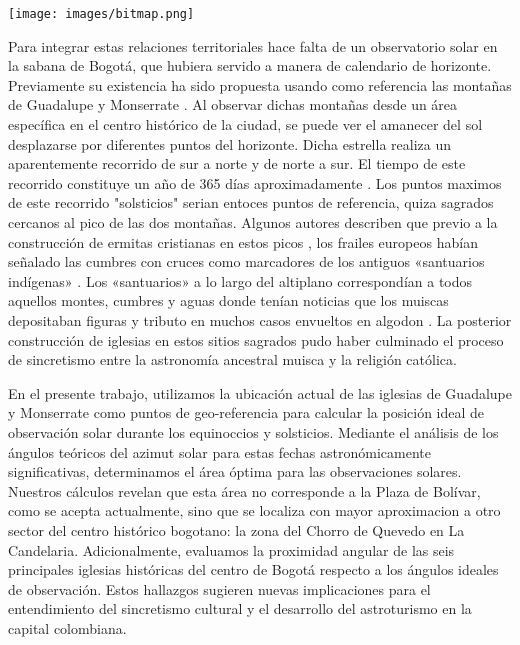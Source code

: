 \documentclass[a4paper,alpha-refs]{eSpectra}
\begin{document}
\smallskip
\centering
   \texttt{[image: images/bitmap.png]}
\justifying

\smallskip

Para integrar estas relaciones territoriales hace falta de un observatorio solar en la sabana de Bogotá, que hubiera servido a manera de calendario de horizonte. Previamente su existencia ha sido propuesta usando como referencia las montañas de Guadalupe y Monserrate \cite{bonilla_observatorio_2011}. Al observar dichas montañas desde un área específica en el centro histórico de la ciudad, se puede ver el amanecer del sol desplazarse por diferentes puntos del horizonte. Dicha estrella realiza un aparentemente recorrido de sur a norte y de norte a sur. El tiempo de este recorrido constituye un año de 365 días aproximadamente \cite{quijano_astronomia_2021}. Los puntos maximos de este recorrido "solsticios" serian entoces puntos de referencia,  quiza sagrados cercanos al pico de las dos montañas.  Algunos autores describen que previo a la construcción de ermitas cristianas en estos picos , los frailes europeos habían señalado las cumbres con cruces como marcadores de los antiguos «santuarios indígenas» \cite{rodriguez_freyle_carnero_1997}. Los «santuarios» a lo largo del altiplano correspondían a todos aquellos montes, cumbres y  aguas donde tenían noticias que los muiscas depositaban figuras y tributo en muchos casos envueltos en algodon  \cite{simon_noticias_historiales_1626}. La posterior construcción de iglesias en estos sitios sagrados pudo haber culminado el proceso de sincretismo entre la astronomía ancestral muisca y la religión católica.


En el presente trabajo,  utilizamos la ubicación actual de las iglesias de Guadalupe y Monserrate como puntos de geo-referencia para calcular la posición ideal de observación solar durante los equinoccios y solsticios. Mediante el análisis de los ángulos teóricos del azimut solar para estas fechas astronómicamente significativas, determinamos el área óptima para las observaciones solares. Nuestros cálculos revelan que esta área no corresponde a la Plaza de Bolívar, como se acepta actualmente, sino que se localiza con mayor aproximacion a otro sector del centro histórico bogotano: la zona del Chorro de Quevedo en La Candelaria. Adicionalmente, evaluamos la proximidad angular de las seis principales iglesias históricas del centro de Bogotá respecto a los ángulos ideales de observación. Estos hallazgos sugieren nuevas implicaciones para el entendimiento del sincretismo cultural y el desarrollo del astroturismo en la capital colombiana.
\end{document}
